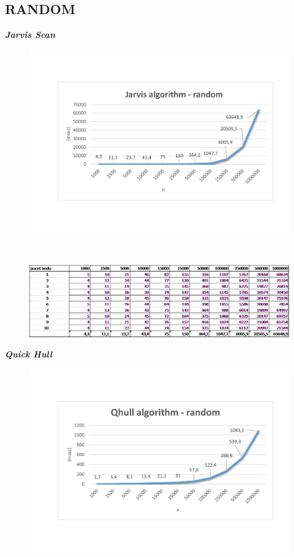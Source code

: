 \documentclass{article}
\begin{document}
\subsection{RANDOM}
\textit{\textbf {Jarvis Scan}}
\\
\begin{figure}[htbp]
\centering
        \includegraphics[clip, trim=0cm 0cm 0cm 0cm, width=1\textwidth]{jr.pdf}
\end{figure}
\\
\begin{figure}[htbp]
\centering
        \includegraphics[clip, trim=0cm 0cm 0cm 0cm, width=1\textwidth]{jr.png}
\end{figure}
\clearpage
\newpage
\textit{\textbf {Quick Hull}}
\\
\begin{figure}[htbp]
\centering
        \includegraphics[clip, trim=0cm 0cm 0cm 0cm, width=1\textwidth]{qr.pdf}
\end{figure}
\end{document}
